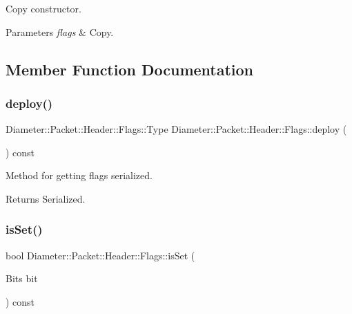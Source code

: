 Copy constructor. 


\begin{DoxyParams}{Parameters}
{\em flags} & Copy. \\
\hline
\end{DoxyParams}


\subsection{Member Function Documentation}
\mbox{\label{classDiameter_1_1Packet_1_1Header_1_1Flags_a6bb796dff7f3e8f128262fb2d3a549bb}} 
\subsubsection{\texorpdfstring{deploy()}{deploy()}}
{\footnotesize\ttfamily Diameter\+::\+Packet\+::\+Header\+::\+Flags\+::\+Type Diameter\+::\+Packet\+::\+Header\+::\+Flags\+::deploy (\begin{DoxyParamCaption}{ }\end{DoxyParamCaption}) const}



Method for getting flags serialized. 

\begin{DoxyReturn}{Returns}
Serialized. 
\end{DoxyReturn}
\mbox{\label{classDiameter_1_1Packet_1_1Header_1_1Flags_ab473570b7a14705c03786b816443e937}} 
\subsubsection{\texorpdfstring{is\+Set()}{isSet()}}
{\footnotesize\ttfamily bool Diameter\+::\+Packet\+::\+Header\+::\+Flags\+::is\+Set (\begin{DoxyParamCaption}\item[{Bits}]{bit }\end{DoxyParamCaption}) const}



